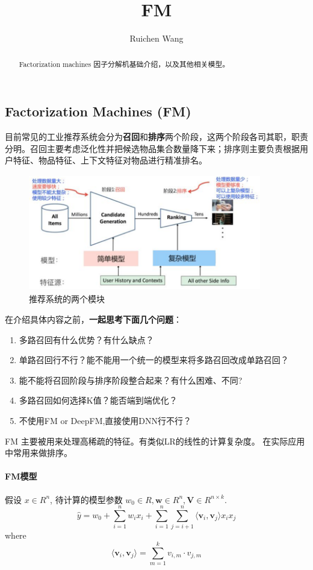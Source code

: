 \documentclass{article}
\author{Ruichen Wang}
\title{FM}
\begin{document}
\begin{CJK*}{UTF8}{gbsn}

\maketitle
\begin{abstract}
Factorization machines 因子分解机基础介绍，以及其他相关模型。
\end{abstract}

\tableofcontents

\section{Factorization Machines (FM)}
目前常见的工业推荐系统会分为\textbf{召回}和\textbf{排序}两个阶段，这两个阶段各司其职，职责分明。召回主要考虑泛化性并把候选物品集合数量降下来；排序则主要负责根据用户特征、物品特征、上下文特征对物品进行精准排名。

\begin{figure}[H]
\centering
\includegraphics[width=4in,height=2in]{recsys}
\caption{推荐系统的两个模块}
\end{figure}

在介绍具体内容之前，\textbf{一起思考下面几个问题}：
\begin{enumerate}
\item{多路召回有什么优势？有什么缺点？}
\item{单路召回行不行？能不能用一个统一的模型来将多路召回改成单路召回？}
\item{能不能将召回阶段与排序阶段整合起来？有什么困难、不同?}
\item{多路召回如何选择K值？能否端到端优化？}
\item{不使用FM or DeepFM,直接使用DNN行不行？}
\end{enumerate}


FM \cite{DBLP:conf/icdm/Rendle10} 主要被用来处理高稀疏的特征。有类似LR的线性的计算复杂度。 在实际应用中常用来做排序。

\paragraph{FM模型} 假设 $x \in R^{n}$, 待计算的模型参数 $ w_{0} \in R, \textbf{w} \in R^{n}, \textbf{V} \in R^{n \times k}$.
$$\widehat{y}= w_{0}+\sum_{i=1}^{n}w_{i}x_{i}+\sum_{i=1}^{n}\sum_{j=i+1}^{n}\langle \textbf{v}_{i} ,\textbf{v}_{j} \rangle x_{i}x_{j}$$
where 
$$\langle \textbf{v}_{i} ,\textbf{v}_{j} \rangle =\sum_{m=1}^{k}v_{i,m} \cdot v_{j,m}$$


\end{CJK*}
\end{document}
